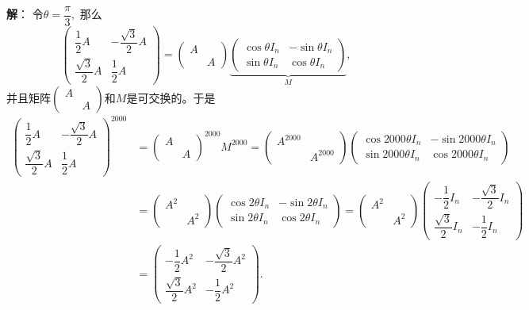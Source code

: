 {\bf 解}： 令$\theta = \dfrac{\pi}{3},$ 那么
$$\begin{pmatrix} \dfrac{1}{2} A & - \dfrac{\sqrt{3}}{2} A \\ \dfrac{\sqrt{3}}{2} A & \dfrac{1}{2} A \end{pmatrix} = \begin{pmatrix} A & \\ & A \end{pmatrix} \underbrace{\begin{pmatrix} \cos\theta I_n & - \sin\theta I_n \\ \sin\theta I_n & \cos\theta I_n \end{pmatrix}}_M,$$
并且矩阵$\begin{pmatrix} A & \\ & A \end{pmatrix}$和$M$是可交换的。于是
\begin{align*}
\begin{pmatrix} \dfrac{1}{2} A & - \dfrac{\sqrt{3}}{2} A \\ \dfrac{\sqrt{3}}{2} A & \dfrac{1}{2} A \end{pmatrix}^{2000} & = \begin{pmatrix} A & \\ & A \end{pmatrix}^{2000} M^{2000} = \begin{pmatrix} A^{2000} & \\ & A^{2000} \end{pmatrix} \begin{pmatrix} \cos 2000\theta I_n & - \sin 2000\theta I_n \\ \sin 2000\theta I_n & \cos 2000\theta I_n \end{pmatrix} \\
& = \begin{pmatrix} A^2 & \\ & A^2 \end{pmatrix} \begin{pmatrix} \cos 2\theta I_n & - \sin 2\theta I_n \\ \sin 2\theta I_n & \cos 2\theta I_n \end{pmatrix} = \begin{pmatrix} A^2 & \\ & A^2 \end{pmatrix} \begin{pmatrix} - \dfrac{1}{2} I_n & - \dfrac{\sqrt{3}}{2} I_n \\ \dfrac{\sqrt{3}}{2} I_n & - \dfrac{1}{2} I_n \end{pmatrix} \\
& = \begin{pmatrix} - \dfrac{1}{2} A^2 & - \dfrac{\sqrt{3}}{2} A^2 \\ \dfrac{\sqrt{3}}{2} A^2 & - \dfrac{1}{2} A^2 \end{pmatrix}.
\end{align*}

